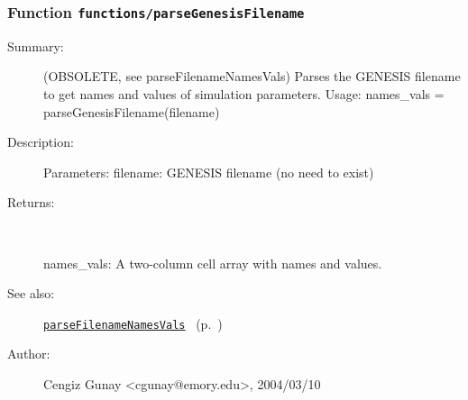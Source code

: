 \subsubsection[Function \texttt{parseGenesisFilename}]{Function \texttt{functions/parseGenesisFilename}}%
%
\label{ref_functions__parseGenesisFilename}%
\hypertarget{ref_functions__parseGenesisFilename}{}%
\begin{description}
\item[Summary:](OBSOLETE, see parseFilenameNamesVals) Parses the GENESIS filename to get names and values of simulation parameters.
 Usage:
 names\_vals = parseGenesisFilename(filename)
%
%
\item[Description:]%
Parameters:
		filename: GENESIS filename (no need to exist)
%
\item[Returns:
]~

		names\_vals: A two-column cell array with names and values.
%
%
\item[See also:]%
\hyperlink{ref_parseFilenameNamesVals}{\texttt{parseFilenameNamesVals}}%
\ (p.~\pageref{ref_parseFilenameNamesVals})%
%
%
\item[Author:]%
Cengiz Gunay <cgunay@emory.edu>, 2004/03/10
%
\end{description}
\methodline%
